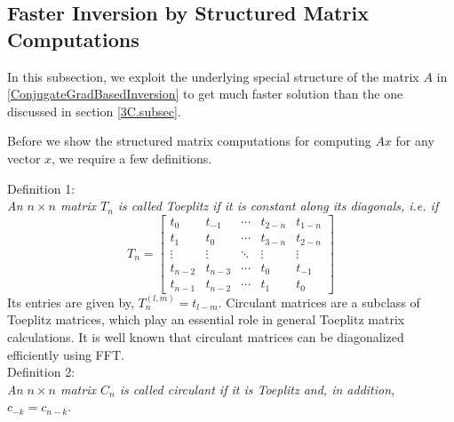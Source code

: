 \documentclass{UCF_ETD}
\begin{document}
 
 \subsection{Faster Inversion by Structured Matrix Computations}
  In this subsection, we exploit the underlying special structure of the matrix $A$ in \eqref{ConjugateGradBasedInversion} to get much faster solution than the one discussed in section \ref{3C.subsec}.
 
 Before we show the structured matrix computations for computing $Ax$ for any vector $x$, we require a few definitions.
 
  Definition 1: \\
 \emph{An $n\times n$ matrix $T_n$ is called Toeplitz if it is constant along its diagonals, i.e. if }
 \begin{equation} \label{ToeplitzDef}
 T_n =\begin{bmatrix}
  t_0    & t_{-1}  &  \cdots  & t_{2-n}    &  t_{1-n} \\
  t_1      &  t_0     &   \cdots  & t_{3-n}     & t_{2-n} \\
  \vdots & \vdots &   \ddots  & \vdots &  \vdots \\
  t_{n-2}      &  t_{n-3}     &   \cdots  &  t_0     &  t_{-1} \\
 t_{n-1}      &   t_{n-2}     &   \cdots  &  t_1     &  t_0
 \end{bmatrix}
 \end{equation}
 Its entries are given by,  $T_{n}^{(l,m)}= t_{l-m}$. Circulant matrices are a subclass of Toeplitz matrices, which play an essential role in general Toeplitz matrix calculations. It is well known that circulant matrices can be diagonalized efficiently using FFT. \\
  Definition 2: \\
 \emph{An $n\times n$ matrix $C_n$ is called circulant if it is Toeplitz and, in addition, $c_{-k} = c_{n-k}$}.
 
\end{document}

